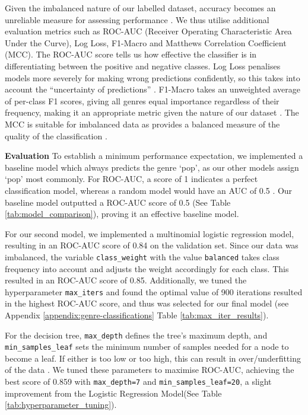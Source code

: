 \documentclass{article}
\newcommand{\minisection}[1]{\textbf{#1}\quad}
\begin{document}
Given the imbalanced nature of our labelled dataset, accuracy becomes an unreliable measure for assessing performance \cite{Brownlee_2021}. We thus utilise additional evaluation metrics such as ROC-AUC (Receiver Operating Characteristic Area Under the Curve), Log Loss, F1-Macro and Matthews Correlation Coefficient (MCC). The ROC-AUC score tells us how effective the classifier is in differentiating between the positive and negative classes. Log Loss penalises models more severely for making wrong predictions confidently, so this takes into account the “uncertainty of predictions” \cite{AI_2024}. F1-Macro takes an unweighted average of per-class F1 scores, giving all genres equal importance regardless of their frequency, making it an appropriate metric given the nature of our dataset \cite{Sefidian_2024}. The MCC is suitable for imbalanced data as provides a balanced measure of the quality of the classification \cite{learn_2025}. 


\minisection{Evaluation} To establish a minimum performance expectation, we implemented a baseline model which always predicts the genre ‘pop’, as our other models assign `pop' most commonly. For ROC-AUC, a score of 1 indicates a perfect classification model, whereas a random model would have an AUC of 0.5 \cite{AI_2025a}. Our baseline model outputted a ROC-AUC score of 0.5 (See Table \ref{tab:model_comparison}), proving it an effective baseline model.

For our second model, we implemented a multinomial logistic regression model, resulting in an ROC-AUC score of 0.84 on the validation set. Since our data was imbalanced, the variable \texttt{class\_weight} with the value \texttt{balanced} takes class frequency into account and adjusts the weight accordingly for each class. This resulted in an ROC-AUC score of 0.85. Additionally, we tuned the hyperparameter \texttt{max\_iters} and found the optimal value of 900 iterations resulted in the highest ROC-AUC score, and thus was selected for our final model (see Appendix \ref{appendix:genre-classifications} Table \ref{tab:max_iter_results}).

For the decision tree, \texttt{max\_depth} defines the tree’s maximum depth, and \texttt{min\_samples\_leaf} sets the minimum number of samples needed for a node to become a leaf. If either is too low or too high, this can result in over/underfitting of the data \cite{forGeeks_2025}\cite{Hankare_2023}. We tuned these parameters to maximise ROC-AUC, achieving the best score of 0.859 with \texttt{max\_depth=7} and \texttt{min\_samples\_leaf=20}, a slight improvement from the Logistic Regression Model(See Table \ref{tab:hyperparameter_tuning}). 
\end{document}
